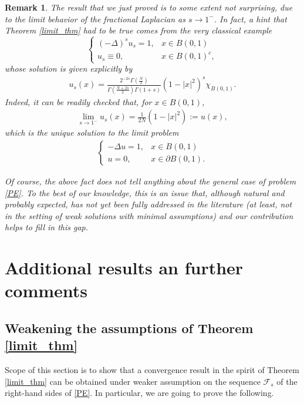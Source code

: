\documentclass[reqno,twoside]{amsart}
\newtheorem{remark}[theorem]{Remark}
\numberwithin{equation}{section}
\newcommand{\fl}[2]{(-\Delta)^#1#2}
\begin{document}
\begin{remark}
The result that we just proved is to some extent not surprising, due to the limit behavior of the fractional Laplacian as $s\to 1^-$. In fact, a hint that Theorem \ref{limit_thm} had to be true comes from the very classical example
\begin{equation*}
	\begin{cases}
		\fl{s}{u_s} =1, &x\in B(0,1)
		\\
		u_s\equiv 0, & x\in B(0,1)^c,
	\end{cases}
\end{equation*}
whose solution is given explicitly by
\begin{align*}
	u_s(x) = \frac{2^{-2s}\Gamma\left(\frac N2\right)}{\Gamma\left(\frac{N+2s}{2}\right)\Gamma(1+s)}\left(1-|x|^2\right)^s\chi_{B(0,1)}.
\end{align*}
Indeed, it can be readily checked that, for $x\in B(0,1)$, 
\begin{align*}
	\lim_{s\to 1^-} u_s(x) = \frac{1}{2N}\left(1-|x|^2\right):=u(x),
\end{align*}
which is the unique solution to the limit problem 
\begin{align*}
	\begin{cases}
		-\Delta u =1 , &x\in B(0,1)
		\\
		u= 0, & x\in \partial B(0,1).
	\end{cases}
\end{align*}

Of course, the above fact does not tell anything about the general case of problem \eqref{PE}. To the best of our knowledge, this is an issue that, although natural and probably expected, has not yet been fully addressed in the literature (at least, not in the setting of weak solutions with minimal assumptions) and our contribution helps to fill in this gap. 
\end{remark}

\section{Additional results an further comments}\label{rem_sec}

\subsection{Weakening the assumptions of Theorem \ref{limit_thm}}

Scope of this section is to show that a convergence result in the spirit of Theorem \ref{limit_thm} can be obtained under weaker assumption on the sequence $\mathcal F_s$ of the right-hand sides of \eqref{PE}. In particular, we are going to prove the following.
\end{document}
